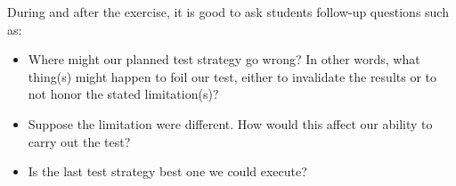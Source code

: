 During and after the exercise, it is good to ask students follow-up questions such as:

\begin{itemize}
\item{} Where might our planned test strategy go wrong?  In other words, what thing(s) might happen to foil our test, either to invalidate the results or to not honor the stated limitation(s)?
\item{} Suppose the limitation were different.  How would this affect our ability to carry out the test?
\item{} Is the last test strategy best one we could execute?
\end{itemize}






